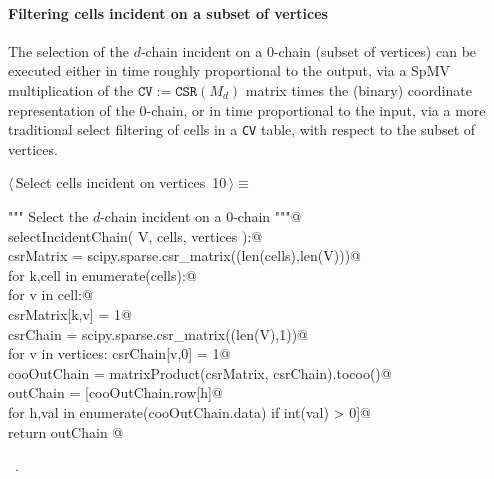\documentclass[11pt,oneside]{article}	%
\begin{document}
\paragraph{Filtering cells incident on a subset of vertices}

The selection of the $d$-chain incident on a $0$-chain (subset of vertices) can be executed either in time roughly proportional to the output, via a SpMV multiplication of the $\texttt{CV} := \texttt{CSR}(M_d)$ matrix times the (binary) coordinate representation of the $0$-chain, or in time proportional to the input, via a more traditional select filtering of cells in a \texttt{CV} table, with respect to the subset of vertices.

\begin{flushleft} \small \label{scrap15}
\protect{}$\langle\,$Select cells incident on vertices\nobreak\ {\footnotesize 10}$\,\rangle\equiv$
\vspace{-1ex}
\begin{list}{}{} \item
\mbox{}\verb@""" Select the $d$-chain incident on a $0$-chain """@\\
\mbox{}\verb@def selectIncidentChain( V, cells, vertices ):@\\
\mbox{}\verb@   csrMatrix = scipy.sparse.csr_matrix((len(cells),len(V)))@\\
\mbox{}\verb@   for k,cell in enumerate(cells):@\\
\mbox{}\verb@      for v in cell:@\\
\mbox{}\verb@         csrMatrix[k,v] = 1@\\
\mbox{}\verb@   csrChain = scipy.sparse.csr_matrix((len(V),1))@\\
\mbox{}\verb@   for v in vertices: csrChain[v,0] = 1@\\
\mbox{}\verb@   cooOutChain = matrixProduct(csrMatrix, csrChain).tocoo()@\\
\mbox{}\verb@   outChain = [cooOutChain.row[h]@\\
\mbox{}\verb@      for h,val in enumerate(cooOutChain.data) if int(val) > 0]@\\
\mbox{}\verb@   return outChain @\\
\mbox{}\verb@@{\NWsep}
\end{list}
\vspace{-1ex}
\footnotesize\addtolength{\baselineskip}{-1ex}
\begin{list}{}{\setlength{\itemsep}{-\parsep}\setlength{\itemindent}{-\leftmargin}}
\item \NWtxtMacroRefIn\ .
\end{list}
\end{flushleft}
\end{document}
